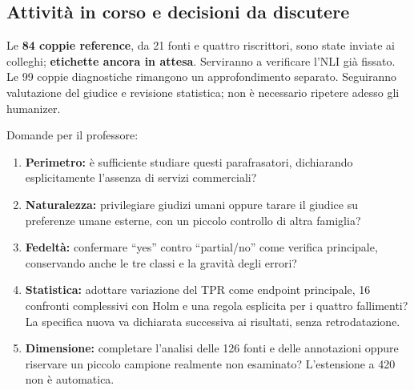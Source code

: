 \subsection{Attività in corso e decisioni da discutere}\label{attivituxe0-in-corso-e-decisioni-da-discutere}

Le \textbf{84 coppie reference}, da 21 fonti e quattro riscrittori, sono state inviate ai colleghi; \textbf{etichette ancora in attesa}. Serviranno a verificare l'NLI già fissato. Le 99 coppie diagnostiche rimangono un approfondimento separato. Seguiranno valutazione del giudice e revisione statistica; non è necessario ripetere adesso gli humanizer.

Domande per il professore:

\begin{enumerate}
\def\labelenumi{\arabic{enumi}.}
\tightlist
\item
  \textbf{Perimetro:} è sufficiente studiare questi parafrasatori, dichiarando esplicitamente l'assenza di servizi commerciali?
\item
  \textbf{Naturalezza:} privilegiare giudizi umani oppure tarare il giudice su preferenze umane esterne, con un piccolo controllo di altra famiglia?
\item
  \textbf{Fedeltà:} confermare ``yes'' contro ``partial/no'' come verifica principale, conservando anche le tre classi e la gravità degli errori?
\item
  \textbf{Statistica:} adottare variazione del TPR come endpoint principale, 16 confronti complessivi con Holm e una regola esplicita per i quattro fallimenti? La specifica nuova va dichiarata successiva ai risultati, senza retrodatazione.
\item
  \textbf{Dimensione:} completare l'analisi delle 126 fonti e delle annotazioni oppure riservare un piccolo campione realmente non esaminato? L'estensione a 420 non è automatica.
\end{enumerate}
